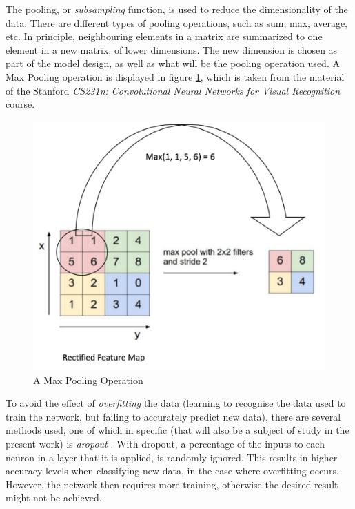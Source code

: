 \documentclass[final,12p,times]{elsarticle}
\begin{document}
  
The pooling, or \emph{subsampling} function, is used to reduce the dimensionality of the data.
There are different types of pooling operations, such as sum, max, average, etc.
In principle, neighbouring elements in a matrix are summarized to one element in a new matrix, of lower dimensions.
The new dimension is chosen as part of the model design, as well as what will be the pooling operation used.
A Max Pooling operation is displayed in figure \ref{fig:Fig2.5}, which is taken from the material of the Stanford 
\emph{CS231n: Convolutional Neural Networks for Visual Recognition} course.

\begin{figure}[H]
  \includegraphics[width=1.0\textwidth, center]{pooling.png}
  \caption{A Max Pooling Operation}
  \label{fig:Fig2.5}
  \end{figure}


To avoid the effect of \emph{overfitting} the data (learning to recognise the data used to train the network, but failing to accurately predict new data), there are several methods used,
one of which in specific (that will also be a subject of study in the present work) is \emph{dropout} \cite{Srivastava2014}.
With dropout, a percentage of the inputs to each neuron in a layer that it is applied, is randomly ignored.
This results in higher accuracy levels when classifying new data, in the case where overfitting occurs.
However, the network then requires more training, otherwise the desired result might not be achieved.
\end{document}
